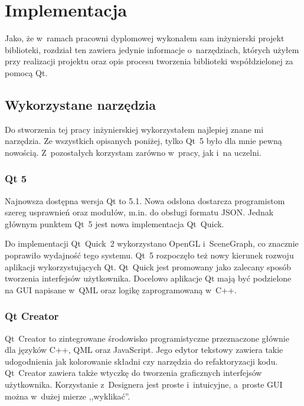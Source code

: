 \chapter{Implementacja}
Jako, że w~ramach pracowni dyplomowej wykonałem sam inżynierski projekt biblioteki, rozdział ten zawiera jedynie informacje o~narzędziach, których użyłem przy realizacji projektu oraz opis procesu tworzenia biblioteki współdzielonej za pomocą Qt.


\section{Wykorzystane narzędzia}
Do stworzenia tej pracy inżynierskiej wykorzystałem najlepiej znane mi narzędzia. Ze wszystkich opisanych poniżej, tylko Qt~5 było dla mnie pewną nowością. Z~pozostałych korzystam zarówno w~pracy, jak i~na uczelni.
 
\subsection{Qt 5}
Najnowsza dostępna wersja Qt to 5.1. Nowa odsłona dostarcza programistom szereg usprawnień oraz modułów, m.in. do obsługi formatu JSON. Jednak głównym punktem Qt~5 jest nowa implementacja Qt~Quick. 

Do implementacji Qt~Quick~2 wykorzystano OpenGL i~SceneGraph, co znacznie poprawiło wydajność tego systemu. Qt~5 rozpoczęło też nowy kierunek rozwoju aplikacji wykorzystujących Qt. Qt~Quick jest promowany jako zalecany sposób tworzenia interfejsów użytkownika. Docelowo aplikacje Qt mają być podzielone na GUI napisane w~QML oraz logikę zaprogramowaną w~C++.

\subsection{Qt Creator}
Qt~Creator to zintegrowane środowisko programistyczne przeznaczone głównie dla języków C++, QML oraz JavaScript. Jego edytor tekstowy zawiera takie udogodnienia jak kolorowanie składni czy narzędzia do refaktoryzacji kodu. Qt~Creator zawiera także wtyczkę do tworzenia graficznych interfejsów użytkownika. Korzystanie z~Designera jest proste i~intuicyjne, a~proste GUI można w~dużej mierze ,,wyklikać''.

